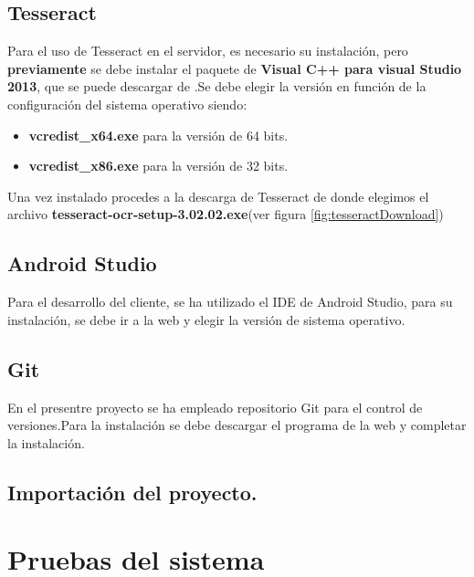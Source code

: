 	\subsection{Tesseract}
	Para el uso de Tesseract en el servidor, es necesario su instalación, pero \textbf{previamente} se debe instalar el paquete de \textbf{Visual C++ para visual Studio 2013}, que se puede descargar de \cite{paqueteVisual}.Se debe elegir la versión en función de la configuración del sistema operativo siendo:
	\begin{itemize}
		\item \textbf{vcredist\_x64.exe} para la versión de 64 bits.
		\item \textbf{vcredist\_x86.exe} para la versión de 32 bits.
	\end{itemize}
Una vez instalado procedes a la descarga de Tesseract de \cite{tesseract} donde elegimos el archivo \textbf{tesseract-ocr-setup-3.02.02.exe}(ver figura \ref{fig:tesseractDownload})

	
	\subsection{Android Studio}
	Para el desarrollo del cliente, se ha utilizado el IDE de Android Studio, para su instalación, se debe ir a la web \cite{androidStudio} y elegir la versión de sistema operativo.
	
	\subsection{Git}
	En el presentre proyecto se ha empleado repositorio Git para el control de versiones.Para la instalación se debe descargar el programa de la web \cite{git} y completar la instalación.

\subsection{Importación del proyecto.}

\section{Pruebas del sistema}
